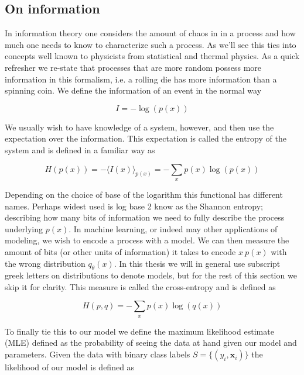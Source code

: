 \subsection{On information}

In information theory one considers the amount of chaos in in a process and how much one needs to know to characterize such a process. As we'll see this ties into concepts well known to physicists from statistical and thermal physics. As a quick refresher we re-state that processes that are more random possess more information in this formalism, i.e. a rolling die has more information than a spinning coin. We define the information of an event in the normal way 

\begin{equation}
I = -\log(p(x))
\end{equation} 

\noindent We usually wish to have knowledge of a system, however, and then use the expectation over the information. This expectation is called the entropy of the system and is defined in a familiar way as 

\begin{equation}
H(p(x)) = -\langle I(x) \rangle_{p(x)} = - \sum _x p(x)\log(p(x))
\end{equation}

\noindent Depending on the choice of base of the logarithm this functional has different names. Perhaps widest used is log base 2 know as the Shannon entropy; describing how many bits of information we need to fully describe the process underlying $p(x)$. In machine learning, or indeed may other applications of modeling, we wish to encode a process with a model. We can then measure the amount of bits (or other units of information) it takes to encode $x ~ p(x)$ with the wrong distribution $q_{\theta}(x)$. In this thesis we will in general use subscript greek letters on distributions to denote models, but for the rest of this section we skip it for clarity. This measure is called the cross-entropy and is defined as

\begin{equation}
H(p, q) = - \sum_x p(x)\log(q(x))
\end{equation}

\noindent To finally tie this to our model we define the maximum likelihood estimate (MLE) defined as the probability of seeing the data at hand given our model and parameters. Given the data with binary class labels $S = \{(y_i, \mathbf{x}_i)\}$ the likelihood of our model is defined as 

